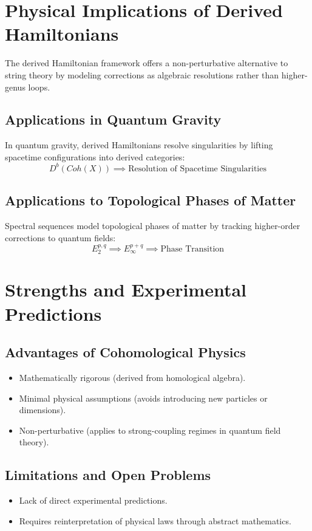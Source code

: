 \documentclass{article}
\begin{document}
\section{Physical Implications of Derived Hamiltonians}
The derived Hamiltonian framework offers a non-perturbative alternative to string theory by modeling corrections as algebraic resolutions rather than higher-genus loops.

\subsection{Applications in Quantum Gravity}
In quantum gravity, derived Hamiltonians resolve singularities by lifting spacetime configurations into derived categories:
\[
D^b(Coh(X)) \implies \text{Resolution of Spacetime Singularities}
\]

\subsection{Applications to Topological Phases of Matter}
Spectral sequences model topological phases of matter by tracking higher-order corrections to quantum fields:
\[
E_2^{p,q} \implies E_\infty^{p+q} \implies \text{Phase Transition}
\]

\section{Strengths and Experimental Predictions}
\subsection{Advantages of Cohomological Physics}
\begin{itemize}
    \item Mathematically rigorous (derived from homological algebra).
    \item Minimal physical assumptions (avoids introducing new particles or dimensions).
    \item Non-perturbative (applies to strong-coupling regimes in quantum field theory).
\end{itemize}

\subsection{Limitations and Open Problems}
\begin{itemize}
    \item Lack of direct experimental predictions.
    \item Requires reinterpretation of physical laws through abstract mathematics.
\end{itemize}
\end{document}
